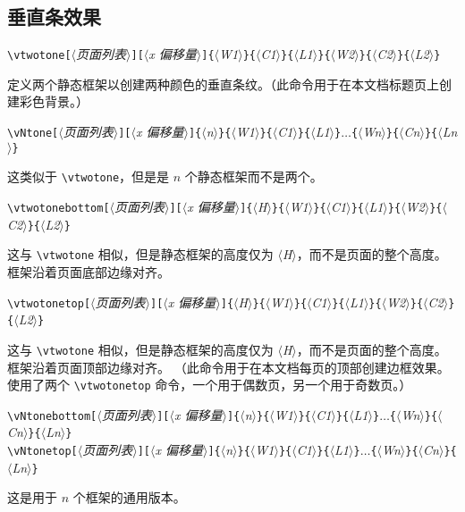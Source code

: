 \documentclass[a4paper]{book}%
\newcommand{\meta}[1]{\textnormal{\ensuremath{\langle}\makebox[0pt][l]{}\emph{#1}\makebox[0pt][l]{}\ensuremath{\rangle}}}
\begin{document}
\subsection{垂直条效果}%
\begin{mdframed}
    \verb|\vtwotone[|\meta{页面列表}\verb|][|\meta{x 偏移量}\verb|]{|\meta{W1}\verb|}{|\meta{C1}\verb|}{|\meta{L1}\verb|}{|\meta{W2}\verb|}{|\meta{C2}\verb|}{|\meta{L2}\verb|}|
\end{mdframed}
定义两个静态框架以创建两种颜色的垂直条纹。（此命令用于在本文档标题页上创建彩色背景。）
\begin{mdframed}
    \verb|\vNtone[|\meta{页面列表}\verb|][|\meta{x 偏移量}\verb|]{|\meta{n}\verb|}{|\meta{W1}\verb|}{|\meta{C1}\verb|}{|\meta{L1}\verb|}|$\ldots$\verb|{|\meta{Wn}\verb|}{|\meta{Cn}\verb|}{|\meta{Ln}\verb|}|
\end{mdframed}
这类似于 \verb|\vtwotone|，但是是 $n$ 个静态框架而不是两个。
\begin{mdframed}
    \verb|\vtwotonebottom[|\meta{页面列表}\verb|][|\meta{x 偏移量}\verb|]{|\meta{H}\verb|}{|\meta{W1}\verb|}{|\meta{C1}\verb|}{|\meta{L1}\verb|}{|\meta{W2}\verb|}{|\meta{C2}\verb|}{|\meta{L2}\verb|}|
\end{mdframed}
这与 \verb|\vtwotone| 相似，但是静态框架的高度仅为 \meta{H}，而不是页面的整个高度。 框架沿着页面底部边缘对齐。
\begin{mdframed}
    \verb|\vtwotonetop[|\meta{页面列表}\verb|][|\meta{x 偏移量}\verb|]{|\meta{H}\verb|}{|\meta{W1}\verb|}{|\meta{C1}\verb|}{|\meta{L1}\verb|}{|\meta{W2}\verb|}{|\meta{C2}\verb|}{|\meta{L2}\verb|}|
\end{mdframed}
这与 \verb|\vtwotone| 相似，但是静态框架的高度仅为 \meta{H}，而不是页面的整个高度。 框架沿着页面顶部边缘对齐。 （此命令用于在本文档每页的顶部创建边框效果。使用了两个 \verb|\vtwotonetop| 命令，一个用于偶数页，另一个用于奇数页。）
\begin{mdframed}
    \verb|\vNtonebottom[|\meta{页面列表}\verb|][|\meta{x 偏移量}\verb|]{|\meta{n}\verb|}{|\meta{W1}\verb|}{|\meta{C1}\verb|}{|\meta{L1}\verb|}|$\ldots$\verb|{|\meta{Wn}\verb|}{|\meta{Cn}\verb|}{|\meta{Ln}\verb|}|\\
    \verb|\vNtonetop[|\meta{页面列表}\verb|][|\meta{x 偏移量}\verb|]{|\meta{n}\verb|}{|\meta{W1}\verb|}{|\meta{C1}\verb|}{|\meta{L1}\verb|}|$\ldots$\verb|{|\meta{Wn}\verb|}{|\meta{Cn}\verb|}{|\meta{Ln}\verb|}|
\end{mdframed}
这是用于 $n$ 个框架的通用版本。
\end{document}
